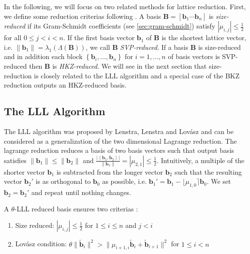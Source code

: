 

In the following, we will focus on two related methods for lattice reduction. %
First, we define some reduction criterias following \cite{ABLR21}. %
A basis $\mathbf{B} = \left[\mathbf{b}_1 \cdots \mathbf{b}_n\right]$ is \textit{size-reduced} if its Gram-Schmidt coefficients (see \cref{sec:gram-schmidt}) satisfy $|\mu_{i,j}| \leq \frac{1}{2}$ for all $0\leq j < i < n$. If the first basis vector $\mathbf{b}_1$ of $\mathbf{B}$ is the shortest lattice vector, i.e. $\|\mathbf{b}_1\| = \lambda_1(\Lambda(\mathbf{B}))$, we call $\mathbf{B}$ \textit{SVP-reduced}. If a basis $\mathbf{B}$ is size-reduced and in addition each block $\left\{\mathbf{b}_i, \dots, \mathbf{b}_n\right\}$ for $i=1, \dots, n$ of basis vectors is SVP-reduced then $\mathbf{B}$ is \textit{HKZ-reduced}. We will see in the next section that size-reduction is closely related to the LLL algorithm and a special case of the BKZ reduction outputs an HKZ-reduced basis.

\subsection{The LLL Algorithm}
The LLL algorithm was proposed by Lenstra, Lenstra and Lovász \cite{LLL82} and can be considered as a generalization of the two dimensional Lagrange reduction. The lagrange reduction reduces a basis of two basis vectors such that output basis satisfies $\|\mathbf{b}_1\| \leq \|\mathbf{b}_2\|$ and $\frac{|\left\langle\mathbf{b}_1, \mathbf{b}_2\right\rangle|}{\|\mathbf{b}_1\|} = |\mu_{2,1}| \leq \frac{1}{2}$. Intuitively, a multiple of the shorter vector $\mathbf{b}_1$ is subtracted from the longer vector $\mathbf{b}_2$ such that the resulting vector $\mathbf{b}_2'$ is as orthogonal to $\mathbf{b}_0$ as possible, i.e.  $\mathbf{b}_1' =  \mathbf{b}_1 - \lfloor\mu_{1,0}\rceil \mathbf{b}_0$. We set $\mathbf{b}_2 = \mathbf{b}_2'$ and repeat until nothing changes.

A $\theta$-LLL reduced basis ensures two criterias \cite{LLL82}:
\begin{enumerate}
  \item Size reduced: $|\mu_{i,j}| \leq \frac{1}{2}$ for $1\leq i \leq n$ and $j < i$ \label{size-red}
  \item Lovász condition: $\theta \| \tilde{\mathbf{b}}_i \|^2 > \| \mu_{i+1, i} \tilde{\mathbf{b}}_i + \tilde{\mathbf{b}}_{i+1} \|^2$ for $1\leq i < n$
\end{enumerate}

